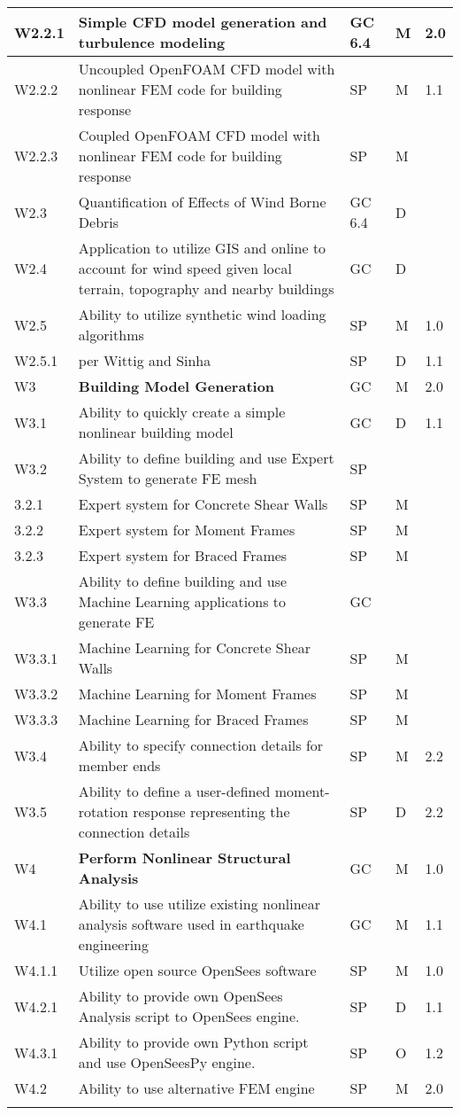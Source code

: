 \begin{longtable}{| p{} | p{} | p{} | p{} |  p{} |}
W2.2.1 & Simple CFD model generation and turbulence modeling & GC 6.4 & M & 2.0 \\ \hline
W2.2.2 & Uncoupled OpenFOAM CFD model with nonlinear FEM code for building response & SP & M & 1.1 \\ \hline
W2.2.3 & Coupled OpenFOAM CFD model with nonlinear FEM code for building response & SP & M &  \\ \hline
W2.3 & Quantification of Effects of Wind Borne Debris & GC 6.4 & D & \\ \hline
W2.4 & Application to utilize GIS and online to account for wind speed given local terrain, topography and nearby buildings & GC & D & \\ \hline
W2.5 & Ability to utilize synthetic wind loading algorithms & SP & M & 1.0  \\ \hline
W2.5.1 & per Wittig and Sinha & SP & D & 1.1  \\ \hhline{=====}
W3 & \textbf{Building Model Generation} & GC & M & 2.0 \\ \hline
W3.1 & Ability to quickly create a simple nonlinear building model & GC & D & 1.1 \\ \hline
W3.2  & Ability to define building and use Expert System to generate FE mesh & SP & &  \\ \hline
	3.2.1 & Expert system for Concrete Shear Walls & SP & M &  \\ \hline
	3.2.2 & Expert system for Moment Frames & SP & M &  \\ \hline
	3.2.3 & Expert system for  Braced Frames & SP & M &   \\ \hline
W3.3 & Ability to define building and use Machine Learning applications to generate FE & GC &  &  \\ \hline
	W3.3.1 & Machine Learning for Concrete Shear Walls & SP & M &  \\ \hline
	W3.3.2 & Machine Learning for Moment Frames & SP & M &  \\ \hline
	W3.3.3 & Machine Learning for Braced Frames & SP & M &   \\ \hline
	W3.4 & Ability to specify connection details for member ends & SP & M & 2.2 \\ \hline
	W3.5 & Ability to define a user-defined moment-rotation response representing the connection details & SP & D & 2.2 \\ \hline
	W4 & \textbf{Perform Nonlinear Structural Analysis} & GC & M & 1.0 \\ \hhline{=====}
W4.1 & Ability to use utilize existing nonlinear analysis software used in earthquake engineering & GC & M & 1.1 \\ \hline
W4.1.1 & Utilize open source OpenSees software & SP & M & 1.0 \\ \hline
W4.2.1 & Ability to provide own OpenSees Analysis script to OpenSees engine. & SP & D & 1.1 \\ \hline
W4.3.1 & Ability to provide own Python script and use OpenSeesPy engine. & SP & O & 1.2 \\ \hline
W4.2 & Ability to use alternative FEM engine & SP & M & 2.0 \\ \hhline{=====}


\end{longtable}
